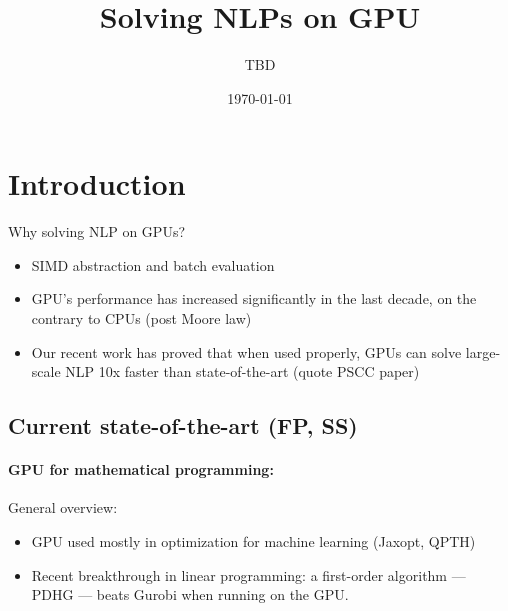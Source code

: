 \documentclass{article}
\title{Solving NLPs on GPU}
\author{TBD}
\date{\today}
\theoremstyle{definition}
\theoremstyle{remark}
\begin{document}
\maketitle

\tableofcontents

\section{Introduction}
Why solving NLP on GPUs?
\begin{itemize}
  \item SIMD abstraction and batch evaluation
  \item GPU's performance has increased significantly in the last decade, on the contrary to CPUs (post Moore law)
  \item Our recent work has proved that when used properly,
    GPUs can solve large-scale NLP 10x faster than state-of-the-art (quote PSCC paper)
\end{itemize}

\subsection{Current state-of-the-art (FP, SS)}

\paragraph{GPU for mathematical programming:}
General overview:
\begin{itemize}
  \item GPU used mostly in optimization for machine learning (Jaxopt, QPTH)
  \item Recent breakthrough in linear programming: a first-order
    algorithm --- PDHG --- beats Gurobi when running on the GPU.
\end{itemize}
\end{document}

